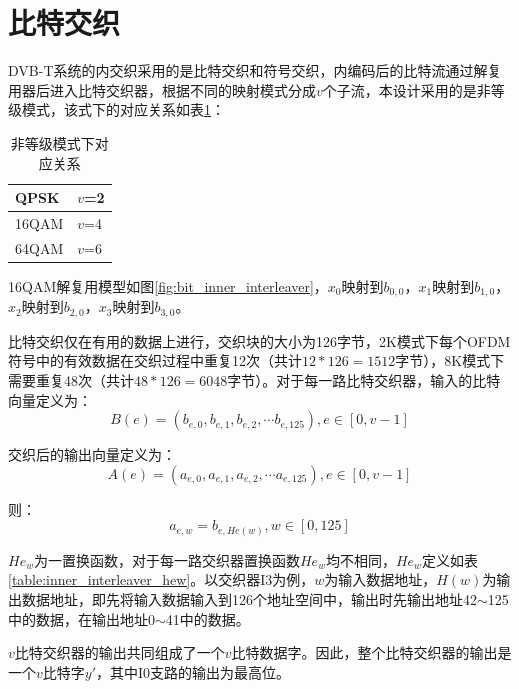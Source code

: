 	\section{比特交织}
		\par DVB-T系统的内交织采用的是比特交织和符号交织，内编码后的比特流通过解复用器后进入比特交织器，根据不同的映射模式分成$v$个子流，本设计采用的是非等级模式，该式下的对应关系如表\ref{table:bit_inner_interleaver_v}：
		\begin{table}[!htbp]
			\centering
			\caption{非等级模式下对应关系}
			\begin{tabular*}{5cm}{l|l}
				\hline\hline
				QPSK & $v$=2 \\
				\hline
				16QAM & $v$=4 \\
				\hline
				64QAM & $v$=6 \\
				\hline\hline
			\end{tabular*}
			\label{table:bit_inner_interleaver_v}
		\end{table}
		\par 16QAM解复用模型如图\ref{fig:bit_inner_interleaver}，$x_0$映射到$b_{0,0}$，$x_1$映射到$b_{1,0}$，$x_2$映射到$b_{2,0}$，$x_3$映射到$b_{3,0}$。
		
		\par 比特交织仅在有用的数据上进行，交织块的大小为126字节，2K模式下每个OFDM符号中的有效数据在交织过程中重复12次（共计$12*126=1512$字节），8K模式下需要重复48次（共计$48*126=6048$字节）。对于每一路比特交织器，输入的比特向量定义为：
		\begin{equation}
			B(e)=(b_{e,0},b_{e,1},b_{e,2},\cdots b_{e,125}),e\in[0,v-1]
		\end{equation}
		\par 交织后的输出向量定义为：
		\begin{equation}
			A(e)=(a_{e,0},a_{e,1},a_{e,2},\cdots a_{e,125}),e\in[0,v-1]
		\end{equation}
		\par 则：
		\begin{equation}
			a_{e,w}=b_{e,He(w)},w\in[0,125]
		\end{equation}
		\par $He_{w}$为一置换函数，对于每一路交织器置换函数$He_{w}$均不相同，$He_{w}$定义如表\ref{table:inner_interleaver_hew}。以交织器I3为例，$w$为输入数据地址，$H(w)$为输出数据地址，即先将输入数据输入到126个地址空间中，输出时先输出地址42$\sim$125中的数据，在输出地址0$\sim$41中的数据。
		
		\par $v$比特交织器的输出共同组成了一个$v$比特数据字。因此，整个比特交织器的输出是一个$v$比特字$y'$，其中I0支路的输出为最高位。
